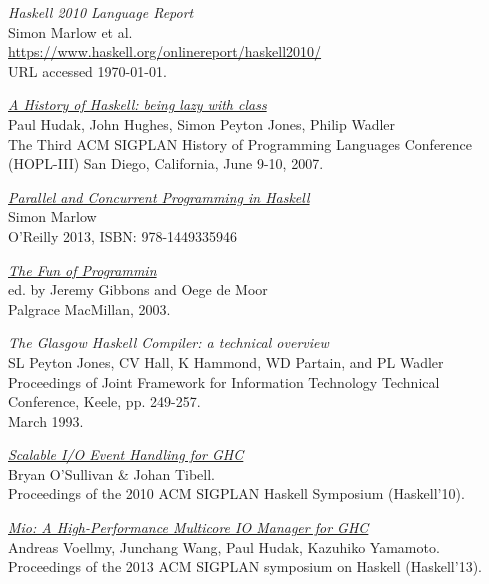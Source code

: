 \documentclass[a4paper,11pt,oneside]{report}
\begin{document}
\begin{thebibliography}{9}

  \emph{Haskell 2010 Language Report}\\
  \newblock Simon Marlow et al.\\
  \newblock \url{https://www.haskell.org/onlinereport/haskell2010/}\\
  \newblock URL accessed \today.

  \href{http://research.microsoft.com/en-us/um/people/simonpj/papers/history-of-haskell/history.pdf}{\emph{A History of Haskell: being lazy with class}}\\
  \newblock Paul Hudak, John Hughes, Simon Peyton Jones, Philip Wadler\\
  \newblock The Third ACM SIGPLAN History of Programming Languages Conference
  (HOPL-III) San Diego, California, June 9-10, 2007.

  \href{http://community.haskell.org/~simonmar/pcph/}{\emph{Parallel and Concurrent
    Programming in Haskell}}\\
  \newblock Simon Marlow\\
  \newblock O'Reilly 2013, ISBN: 978-1449335946

  \href{https://www.cs.ox.ac.uk/publications/books/fop/}{\emph{The Fun of Programmin}}\\
  \newblock ed. by Jeremy Gibbons and Oege de Moor\\
  \newblock Palgrace MacMillan, 2003.

 \emph{The Glasgow Haskell Compiler: a technical
    overview}\\
  \newblock SL Peyton Jones, CV Hall, K Hammond, WD Partain, and PL Wadler\\
  \newblock Proceedings of Joint Framework for Information Technology Technical
  Conference, Keele, pp. 249-257.\\
  \newblock March 1993.

  \href{http://research.google.com/pubs/pub36841.html}{\emph{Scalable I/O Event Handling for GHC}}\\
  \newblock Bryan O'Sullivan \& Johan Tibell.\\
  \newblock Proceedings of the 2010 ACM SIGPLAN Haskell Symposium (Haskell'10).

  \href{http://haskell.cs.yale.edu/wp-content/uploads/2013/08/hask035-voellmy.pdf}{\emph{Mio:
      A High-Performance Multicore IO
      Manager for GHC}}\\
  \newblock Andreas Voellmy, Junchang Wang, Paul Hudak, Kazuhiko Yamamoto.\\
  \newblock Proceedings of the 2013 ACM SIGPLAN symposium on Haskell (Haskell'13).


\end{thebibliography}
\end{document}
